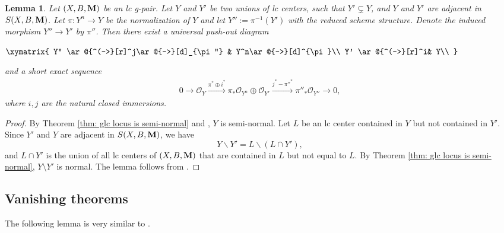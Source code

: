 \documentclass[11pt]{amsart}
\numberwithin{equation}{section}
\newcommand{\Mm}{{\bf{M}}}
\newcommand{\Oo}{\mathcal{O}}
\newtheorem{lem}[thm]{Lemma}
\theoremstyle{definition}
\theoremstyle{definition}
\theoremstyle{definition}
\begin{document}
\begin{lem}\label{lem:pushout2}
Let $(X,B,\Mm)$ be an lc g-pair. Let $Y$ and $Y'$ be two unions of lc centers, such that $Y'\subsetneq Y$, and $Y$ and $Y'$ are adjacent in $S(X,B,\Mm)$. Let $\pi: Y^n\rightarrow Y$ be the normalization of $Y$ and let $Y'':=\pi^{-1}(Y')$ with the reduced scheme structure. Denote the induced morphism $Y''\rightarrow Y'$ by $\pi''$. Then there exist a universal push-out diagram
\begin{center}
$\xymatrix{
Y'' \ar@{^(->}[r]^j\ar@{->}[d]_{\pi''} & Y^n\ar@{->}[d]^{\pi}\\
Y' \ar@{^(->}[r]^i& Y\\
}$
\end{center}
and a short exact sequence
\begin{align*}
0\to \Oo_{Y}\xrightarrow{\pi^*\oplus i^*} \pi_*\Oo_{Y^n}\oplus\Oo_{Y'}\xrightarrow{j^*-\pi''^*} \pi''_*\Oo_{Y''}\to 0,
\end{align*}
where $i,j$ are the natural closed immersions.
\end{lem}
\begin{proof}
By Theorem \ref{thm: glc locus is semi-normal} and \cite[Theorem 9.26]{Kol13}, $Y$ is semi-normal. Let $L$ be an lc center contained in $Y$ but not contained in $Y'$. Since $Y'$ and $Y$ are adjacent in $S(X,B,\Mm)$, we have
$$Y\backslash Y'=L\backslash (L\cap Y'),$$
and $L\cap Y'$ is the union of all lc centers of $(X,B,\Mm)$ that are contained in $L$ but not equal to $L$. By Theorem \ref{thm: glc locus is semi-normal}, $Y\setminus Y'$ is normal. The lemma follows from \cite[Lemma 2.6]{CLX23}.
\end{proof}

\subsection{Vanishing theorems}

The following lemma is very similar to \cite[Lemma 2.4]{Xie22}.
\end{document}
